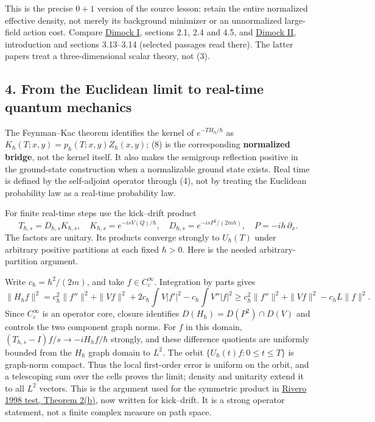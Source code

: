 \documentclass[11pt,a4paper]{article}
\begin{document}
This is the precise \(0+1\) version of the source lesson: retain the
entire normalized effective density, not merely its background minimizer
or an unnormalized large-field action cost. Compare
\href{../docs/balaban/Dimock_BalabanI_1108.1335v2.md}{Dimock I},
sections 2.1, 2.4 and 4.5, and
\href{../docs/balaban/Dimock_BalabanII_1212.5562v2.md}{Dimock II},
introduction and sections 3.13--3.14 (selected passages read there). The
latter papers treat a three-dimensional scalar theory, not (3).

\hypertarget{from-the-euclidean-limit-to-real-time-quantum-mechanics}{%
\subsection{4. From the Euclidean limit to real-time quantum
mechanics}\label{from-the-euclidean-limit-to-real-time-quantum-mechanics}}

The Feynman--Kac theorem identifies the kernel of
\(e^{-TH_\hbar/\hbar}\) as
\(K_\hbar(T;x,y)=p_\hbar(T;x,y)Z_\hbar(x,y)\); (8) is the corresponding
\textbf{normalized bridge}, not the kernel itself. It also makes the
semigroup reflection positive in the ground-state construction when a
normalizable ground state exists. Real time is defined by the
self-adjoint operator through (4), not by treating the Euclidean
probability law as a real-time probability law.

For finite real-time steps use the kick--drift product
\[T_{\hbar,s}=D_{\hbar,s}K_{\hbar,s},\quad
K_{\hbar,s}=e^{-isV(Q)/\hbar},\quad D_{\hbar,s}=e^{-isP^2/(2mh)},
\quad P=-ih\,\partial_x.\tag{15}\] The factors are unitary. Its products
converge strongly to \(U_\hbar(T)\) under arbitrary positive partitions
at each fixed \(\hbar>0\). Here is the needed arbitrary-partition
argument.

Write \(c_\hbar=\hbar^2/(2m)\), and take \(f\in C_c^\infty\).
Integration by parts gives \[
 \|H_hf\|^2=c_\hbar^2\|f''\|^2+\|Vf\|^2
 +2c_\hbar\int V|f'|^2-c_\hbar\int V''|f|^2
 \ge c_\hbar^2\|f''\|^2+\|Vf\|^2-c_hL\|f\|^2.\tag{15a}
\] Since \(C_c^\infty\) is an operator core, closure identifies
\(D(H_\hbar)=D(P^2)\cap D(V)\) and controls the two component graph
norms. For \(f\) in this domain, \((T_{\hbar,s}-I)f/s\to-iH_hf/\hbar\)
strongly, and these difference quotients are uniformly bounded from the
\(H_\hbar\) graph domain to \(L^2\). The orbit
\(\{U_\hbar(t)f:0\le t\le T\}\) is graph-norm compact. Thus the local
first-order error is uniform on the orbit, and a telescoping sum over
the cells proves the limit; density and unitarity extend it to all
\(L^2\) vectors. This is the argument used for the symmetric product in
\href{rivero-1998-conjecture-central-forces.md}{Rivero 1998 test,
Theorem 2(b)}, now written for kick--drift. It is a strong operator
statement, not a finite complex measure on path space.
\end{document}
